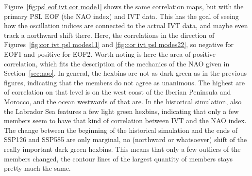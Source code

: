 Figure~\ref{fig:psl eof ivt cor mode1} shows the same correlation maps, but with the primary PSL EOF (the NAO index) and IVT data. 
This has the goal of seeing how the oscillation indices are connected to the actual IVT data, and maybe even track a northward shift there. 
Here, the correlations in the direction of Figures~\ref{fig:cor ivt psl modes11} and \ref{fig:cor ivt psl modes22}, so negative for EOF1 and positive for EOF2.  
Worth noting is here the area of positive correlation, which fits the description of the mechanics of the NAO given in Section~\ref{sec:nao}. 
In general, the hexbins are not as dark green as in the previous figures, indicating that the members do not agree as unanimous. 
The highest are of correlation on that level is on the west coast of the Iberian Peninsula and Morocco, and the ocean westwards of that are. 
In the historical simulation, also the Labrador Sea features a few light green hexbins, indicating that only a few members seem to have that kind of correlation between IVT and the NAO index. 
The change between the beginning of the historical simulation and the ends of SSP126 and SSP585 are only marginal, no (northward or whatsoever) shift of the really important dark green hexbins. 
This means that only a few outliers of the members changed, the contour lines of the largest quantity of members stays pretty much the same. 


